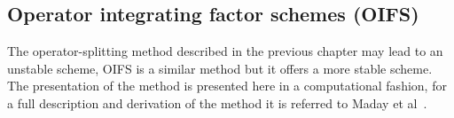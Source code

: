 



\subsection{Operator integrating factor schemes (OIFS)}\label{OIFS}
The operator-splitting method described in the previous chapter may lead to an unstable scheme,
OIFS is a similar method but it offers a more stable scheme. The presentation of the method 
is presented here in a computational fashion, for a full description and derivation of the method 
it is referred to Maday et al~\cite{raey}.

